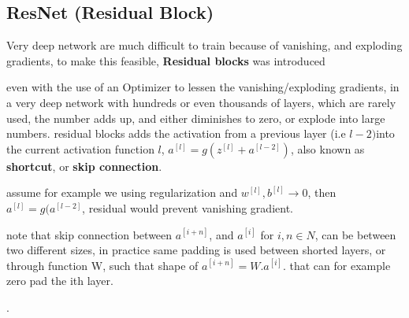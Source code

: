 \documentclass[4apaper,12pt]{book}
\begin{document}
  \subsection{ResNet (Residual Block)}
  \begin{description}
    \item Very deep network are much difficult to train because of vanishing, and exploding gradients, to make this feasible,  \textbf{Residual blocks} was introduced
    \item even with the use of an Optimizer to lessen the vanishing/exploding gradients, in a very deep network with hundreds or even thousands of layers, which are rarely used, the number adds up, and either diminishes to zero, or explode into large numbers. residual blocks adds the activation from a previous layer (i.e $l-2) $into the current activation function $l$, $a^{[l]}=g(z^{[l]}+a^{[l-2]})$, also known as \textbf{shortcut}, or \textbf{skip connection}.
    \item assume for example we using regularization and $w^{[l]},b^{[l]}\rightarrow{0}$, then $a^{[l]}=g(a^{[l-2]}$, residual would prevent vanishing gradient.
    \item note that skip connection between $a^{[i+n]}$, and $a^{[i]}$ for $i,n \in N$, can be between two different sizes, in practice same padding is used between shorted layers, or through function W, such that shape of $a^{[i+n]}=W.a^{[i]}$. that can for example zero pad the ith layer.
      \item .
  \end{description}
\end{document}
